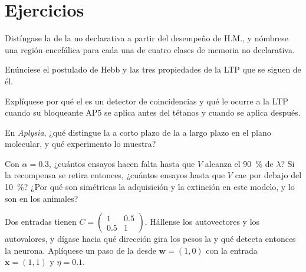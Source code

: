 \section{Ejercicios}

\begin{exercise}[$\star$]\label{exo:b3:learning-memory:1}
Distíngase la  de la no declarativa a partir del
desempeño de H.M., y nómbrese una región encefálica para cada una de
cuatro clases de memoria no declarativa.
\end{exercise}

\begin{exercise}[$\star$]\label{exo:b3:learning-memory:2}
Enúnciese el postulado de Hebb y las tres propiedades de la LTP que se
siguen de él.
\end{exercise}

\begin{exercise}[$\star$]\label{exo:b3:learning-memory:3}
Explíquese por qué el  es un detector de coincidencias y
qué le ocurre a la LTP cuando su bloqueante AP5 se aplica antes del
tétanos y cuando se aplica después.
\end{exercise}

\begin{exercise}[$\star$]\label{exo:b3:learning-memory:4}
En \emph{Aplysia}, ¿qué distingue la  a corto plazo de
la  a largo plazo en el plano molecular, y qué
experimento lo muestra?
\end{exercise}

\begin{exercise}[$\star\star$]\label{exo:b3:learning-memory:5}
Con $\alpha = 0.3$, ¿cuántos ensayos hacen falta hasta que $V$ alcanza
el \qty{90}{\%} de $\lambda$? Si la recompensa se retira entonces,
¿cuántos ensayos hasta que $V$ cae por debajo del \qty{10}{\%}? ¿Por
qué son simétricas la adquisición y la extinción en este modelo, y lo
son en los animales?
\end{exercise}

\begin{exercise}[$\star\star$]\label{exo:b3:learning-memory:6}
Dos entradas tienen $C = \begin{pmatrix}1 & 0.5\\ 0.5 & 1\end{pmatrix}$.
Hállense los autovectores y los autovalores, y dígase hacia qué
dirección gira los pesos la  y qué detecta entonces la
neurona. Aplíquese un paso de la  desde $\mathbf{w} = (1,0)$ con la entrada $\mathbf{x}
= (1,1)$ y $\eta = 0.1$.
\end{exercise}

